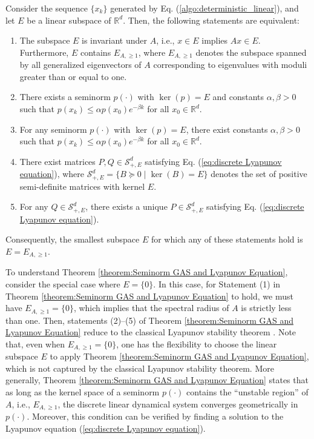 \documentclass[11 pt]{article}
\begin{document}
	\begin{theorem}\label{theorem:Seminorm GAS and Lyapunov Equation}
		Consider the sequence $\{x_k\}$ generated by Eq. (\ref{algo:deterministic_linear}), and let $E$ be a linear subspace of $\mathbb{R}^d$. Then, the following statements are equivalent:  
		\begin{enumerate}[(1)]
			\item  The subspace $E$ is invariant under $A$, i.e., $x \in E$ implies $Ax \in E$. Furthermore, $E$ contains $E_{A,\geq 1}$, where $E_{A,\geq 1}$ denotes the subspace spanned by all generalized eigenvectors of $A$ corresponding to eigenvalues with moduli greater than or equal to one.
			
			\item There exists a seminorm $p(\cdot)$ with $\ker(p) = E$ and constants $\alpha, \beta > 0$ such that $p(x_k) \leq \alpha p(x_0) e^{-\beta k}$ for all $x_0 \in \mathbb{R}^d$.
			
			\item For any seminorm $p(\cdot)$ with $\ker(p) = E$, there exist constants $\alpha, \beta > 0$ such that $p(x_k) \leq \alpha p(x_0) e^{-\beta k}$ for all $x_0 \in \mathbb{R}^d$.
			
			\item There exist matrices $P, Q \in \mathcal{S}^{d}_{+,E}$ satisfying Eq. (\ref{eq:discrete Lyapunov equation}), where $\mathcal{S}^{d}_{+,E} = \{B \succeq 0 \mid \ker(B) = E\}$ denotes the set of positive semi-definite matrices with kernel $E$.
			
			\item For any $Q \in \mathcal{S}^{d}_{+,E}$, there exists a unique $P \in \mathcal{S}^{d}_{+,E}$ satisfying Eq. (\ref{eq:discrete Lyapunov equation}).
		\end{enumerate}
		Consequently, the smallest subspace $E$ for which any of these statements hold is $E = E_{A,\geq 1}$.
	\end{theorem}
	
	To understand Theorem \ref{theorem:Seminorm GAS and Lyapunov Equation}, consider the special case where $E=\{0\}$. In this case, for Statement (1) in Theorem \ref{theorem:Seminorm GAS and Lyapunov Equation} to hold, we must have $E_{A,\geq 1}=\{0\}$, which implies that the spectral radius of $A$ is strictly less than one. Then, statements (2)–(5) of Theorem \ref{theorem:Seminorm GAS and Lyapunov Equation} reduce to the classical Lyapunov stability theorem \cite{khalil2002nonlinear}. Note that, even when $E_{A,\geq 1}=\{0\}$, one has the flexibility to choose the linear subspace $E$ to apply Theorem \ref{theorem:Seminorm GAS and Lyapunov Equation}, which is not captured by the classical Lyapunov stability theorem. More generally, Theorem \ref{theorem:Seminorm GAS and Lyapunov Equation} states that as long as the kernel space of a seminorm $p(\cdot)$ contains the ``unstable region'' of $A$, i.e., $E_{A,\geq 1}$, the discrete linear dynamical system converges geometrically in $p(\cdot)$. Moreover, this condition can be verified by finding a solution to the Lyapunov equation (\ref{eq:discrete Lyapunov equation}). 
	
\end{document}
